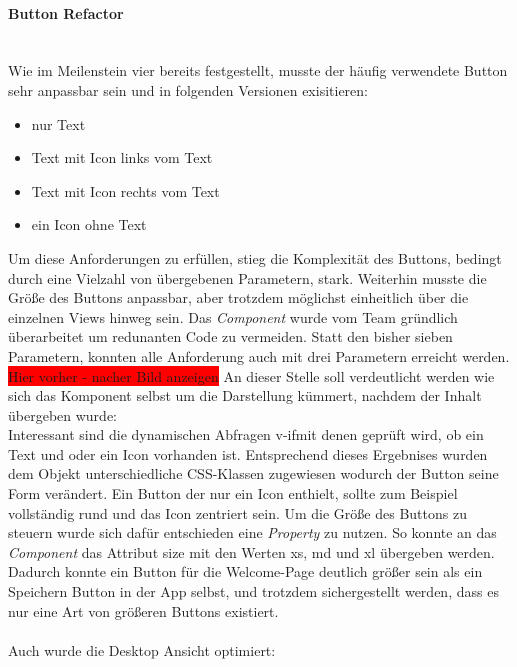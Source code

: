 \documentclass[10pt, a4paper]{article}
\begin{document}
\begin{onehalfspace}
\paragraph*{Button Refactor} $~$ \\
Wie im Meilenstein vier bereits festgestellt, musste der häufig verwendete Button sehr anpassbar sein und in folgenden Versionen exisitieren:
\begin{itemize}
  \item nur Text
  \item Text mit Icon links vom Text
  \item Text mit Icon rechts vom Text
  \item ein Icon ohne Text
\end{itemize}
Um diese Anforderungen zu erfüllen, stieg die Komplexität des Buttons, bedingt durch eine Vielzahl von übergebenen Parametern, stark.
Weiterhin musste die Größe des Buttons anpassbar, aber trotzdem möglichst einheitlich über die einzelnen Views hinweg sein. Das \textit{Component} wurde vom Team gründlich überarbeitet um redunanten Code zu vermeiden. Statt den bisher sieben Parametern, konnten alle Anforderung auch mit drei Parametern erreicht werden.
\colorbox{red}{Hier vorher - nacher Bild anzeigen}
An dieser Stelle soll verdeutlicht werden wie sich das Komponent selbst um die Darstellung kümmert, nachdem der Inhalt übergeben wurde: \\
  \label{fig:HomeVueSchema}
Interessant sind die dynamischen Abfragen \glqq v-if\grqq mit denen geprüft wird, ob ein Text und oder ein Icon vorhanden ist. Entsprechend dieses Ergebnises wurden dem Objekt unterschiedliche CSS-Klassen zugewiesen wodurch der Button seine Form verändert.
Ein Button der nur ein Icon enthielt, sollte zum Beispiel vollständig rund und das Icon zentriert sein.
Um die Größe des Buttons zu steuern wurde sich dafür entschieden eine \textit{Property} zu nutzen. So konnte an das \textit{Component} das Attribut \glqq size\grqq{} mit den Werten \glqq xs\grqq , \glqq md\grqq{} und \glqq xl\grqq{} übergeben werden.
Dadurch konnte ein Button für die Welcome-Page deutlich größer sein als ein Speichern Button in der App selbst, und trotzdem sichergestellt werden, dass es nur eine Art von größeren Buttons existiert.
\\~\\
Auch wurde die Desktop Ansicht optimiert:\\


\end{onehalfspace}
\end{document}
